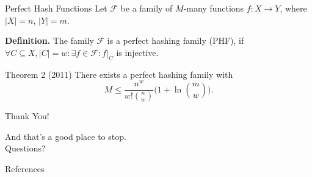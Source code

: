 \documentclass[10pt]{beamer}
\newcommand\restr[2]{\ensuremath{\left.#1\right|_{#2}}}
\begin{document}
\begin{frame}[fragile]{Perfect Hash Functions}
    Let $ \mathcal{F} $ be a family of $ M $-many functions $ f : X \to Y $, where
    $ |X| = n $, $ |Y| = m $. \pause
    
    \textbf{Definition.} The family $ \mathcal{F} $ is a perfect hashing family (PHF), if
    $ \forall C \subseteq X, |C| = w: \exists f \in \mathcal{F}: \restr{f}{C} $ is injective. \pause

    \vfill

    \begin{block}{Theorem 2 (2011)}
        There exists a perfect hashing family with
        \[
            M \leq \frac{n^w}{w!{n \choose w}}\bigg(1 + \ln{m \choose w}\bigg).
        \]
    \end{block}
\end{frame}


\begin{frame}[fragile]{Thank You!}
    \begin{center}
        \large And that's a good place to stop.
        \\
        \vspace*{1em}
        \Large Questions?
    \end{center}
\end{frame}


\appendix
\backupbegin


\begin{frame}[allowframebreaks]{References}
    \nocite{*}
    
    
\end{frame}
\end{document}
